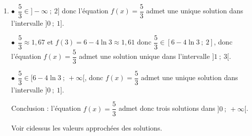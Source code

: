 \documentclass[10pt]{article}
\begin{document}
\begin{enumerate}
\begin{enumerate}
$f(1)=1+4-4\ln(1)-\dfrac{3}{1}=2$;
$f(3) = 3+4-4\ln(3) - \dfrac{3}{3}=6-4\ln(3)\approx 1,69$

On établit le tableau des variations de $f$ en admettant que que $\displaystyle\lim_{x \to 0} f(x) = - \infty$:

\begin{center}
{\renewcommand{\arraystretch}{1.3}
\def\esp{\hspace*{1.5cm}}
\def\hauteur{20pt}
$\begin{array}{|c|l *5{c} c|}
\hline
 x & 0 & \esp & 1 & \esp & 3 & \esp & +\infty \\
 \hline
f'(x) & \vline\;\vline\; &  \pmb{+} & \vline\hspace{-2.7pt}0 & \pmb{-} & \vline\hspace{-2.7pt}0 & \pmb{+} & \\  
\hline
  & \vline\;\vline\; &  & \Rnode{max1}{2} & & & &  \Rnode{max2}{+\infty} \\
f (x) &\vline\;\vline\; &  & & & & & \rule{0pt}{\hauteur}\\
 &\vline\;\vline\; \Rnode{min1}{-\infty} & & & & \Rnode{min2}{6-4\ln(3)\approx 1,61} & & \rule{0pt}{\hauteur} 
\ncline{->}{min1}{max1} 
\ncline{->}{max1}{min2}
\ncline{->}{min2}{max2} \\
\hline
\end{array}$
}
\end{center}

		\item 
$\bullet~~$$\dfrac{5}{3}\in ]-\infty~;~2]$ donc l'équation $f(x) =\dfrac{5}{3}$ admet une unique solution dans l'intervalle $]0~;~1]$.

$\bullet~~$$\dfrac{5}{3} \approx 1,67$ et $f(3) = 6 - 4\ln 3 \approx 1,61$ donc $\dfrac{5}{3} \in [6 - 4\ln 3~;~2]$, donc l'équation $f(x)=\dfrac{5}{3}$ admet une solution unique dans l'intervalle $]1~;~3[$.

$\bullet~~$$\dfrac{5}{3} \in [6 - 4\ln 3~;~+ \infty[$, donc $f(x) =\dfrac{5}{3}$ admet une unique solution dans l'intervalle $]0~;~1]$.

Conclusion : l'équation $f(x)=\dfrac{5}{3}$ admet donc trois solutions dans $]0~;~+\infty[$.

Voir cidessus les valeurs approchées des solutions.
	\end{enumerate}


\end{enumerate}
\end{document}
